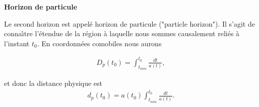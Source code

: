 \documentclass[a4paper,12pt]{report}
\theoremstyle{plain}
\theoremstyle{plain}
\begin{document}
 \textbf{Horizon de particule}  
 
 Le second horizon est appel\'e horizon de particule ("particle horizon"). Il s'agit de conna\^{\i}tre l'\'etendue de la r\'egion \`a laquelle nous sommes causalement reli\'es \`a l'instant $t_0$. En coordonn\'ees comobiles nous aurons 
 
 \begin{eqnarray}
 D_p(t_0) = \displaystyle \int_{t_{min}}^{t_0} \frac{dt}{a(t) }, 
 \end{eqnarray}

 et donc la distance physique est 
 \begin{eqnarray}
 d_p (t_0) =a(t_0) \displaystyle \int_{t_{min}}^{t_0} \frac{dt}{a(t)}.
 \end{eqnarray}

\end{document}
